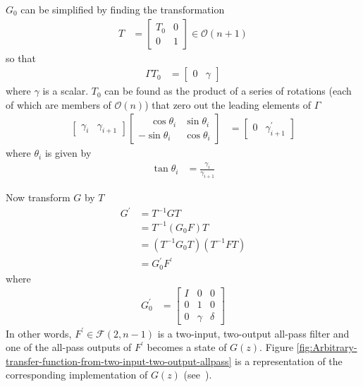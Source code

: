 \documentclass[a4paper,twoside,10pt,english]{report}
\begin{document}
$G_{0}$ can be simplified by finding the transformation 
\begin{align*}
T &= \left[\begin{array}{cc}
T_{0} & 0\\
0 & 1
\end{array}\right]\in\mathcal{O}\left(n+1\right)
\end{align*}
so that 
\begin{align*}
\Gamma T_{0} &= \left[\begin{array}{cc}
0 & \gamma\end{array}\right]
\end{align*}
where $\gamma$ is a scalar. $T_{0}$ can be found as the product
of a series of rotations (each of which are members of
 $\mathcal{O}\left(n\right)$) that zero out the leading elements of $\Gamma$
\begin{align*}
\left[\begin{array}{cc} 
\gamma_{i} & \gamma_{i+1}
\end{array}\right]
\left[\begin{array}{cc}
\phantom{-}\cos \theta_{i} & \sin \theta_{i}\\
          -\sin \theta_{i} & \cos \theta_{i}
\end{array}\right] 
&= 
\left[\begin{array}{cc}
0 & \gamma_{i+1}^{\prime}
\end{array}\right]
\end{align*}
where $\theta_{i}$ is given by 
\begin{align*}
\tan\theta_{i} &= \frac{\gamma_{i}}{\gamma_{i+1}}
\end{align*}

Now transform $G$ by $T$
\begin{align*}
G^{\prime} &= T^{-1}GT\\
 &= T^{-1}\left(G_{0}F\right)T\\
 &= \left(T^{-1}G_{0}T\right)\left(T^{-1}FT\right)\\
 &= G_{0}^{\prime}F^{\prime}
\end{align*}
where
\begin{align*}
G_{0}^{\prime} &= \left[\begin{array}{ccc}
I & 0 & 0\\
0 & 1 & 0\\
0 & \gamma & \delta
\end{array}\right]
\end{align*}
In other words, $F^{\prime}\in\mathcal{F}\left(2,n-1\right)$ is a two-input,
two-output all-pass filter and one of the all-pass outputs of $F^{\prime}$ 
becomes a state of $G\left(z\right)$. Figure 
\ref{fig:Arbitrary-transfer-function-from-two-input-two-output-allpass} is
a representation of the corresponding implementation of $G\left(z\right)$
(see~\cite[Figure 10.4.5]{RobertsMullis_DigitalSignalProcessing}).
\end{document}
